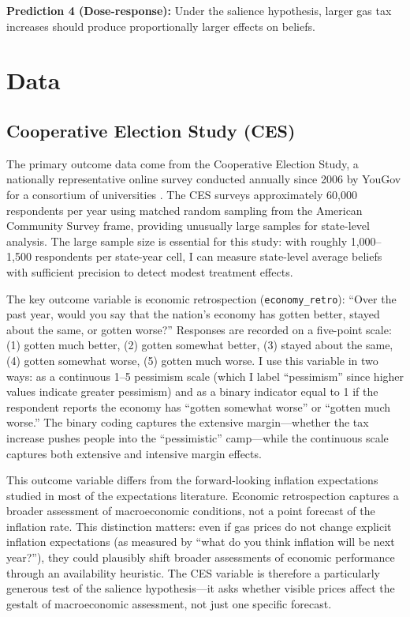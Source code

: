 \documentclass[12pt]{article}
\begin{document}
\textbf{Prediction 4 (Dose-response):} Under the salience hypothesis, larger gas tax increases should produce proportionally larger effects on beliefs.

\section{Data}

\subsection{Cooperative Election Study (CES)}

The primary outcome data come from the Cooperative Election Study, a nationally representative online survey conducted annually since 2006 by YouGov for a consortium of universities \citep{schaffner2023cooperative}. The CES surveys approximately 60,000 respondents per year using matched random sampling from the American Community Survey frame, providing unusually large samples for state-level analysis. The large sample size is essential for this study: with roughly 1,000--1,500 respondents per state-year cell, I can measure state-level average beliefs with sufficient precision to detect modest treatment effects.

The key outcome variable is economic retrospection (\texttt{economy\_retro}): ``Over the past year, would you say that the nation's economy has gotten better, stayed about the same, or gotten worse?'' Responses are recorded on a five-point scale: (1) gotten much better, (2) gotten somewhat better, (3) stayed about the same, (4) gotten somewhat worse, (5) gotten much worse. I use this variable in two ways: as a continuous 1--5 pessimism scale (which I label ``pessimism'' since higher values indicate greater pessimism) and as a binary indicator equal to 1 if the respondent reports the economy has ``gotten somewhat worse'' or ``gotten much worse.'' The binary coding captures the extensive margin---whether the tax increase pushes people into the ``pessimistic'' camp---while the continuous scale captures both extensive and intensive margin effects.

This outcome variable differs from the forward-looking inflation expectations studied in most of the expectations literature. Economic retrospection captures a broader assessment of macroeconomic conditions, not a point forecast of the inflation rate. This distinction matters: even if gas prices do not change explicit inflation expectations (as measured by ``what do you think inflation will be next year?''), they could plausibly shift broader assessments of economic performance through an availability heuristic. The CES variable is therefore a particularly generous test of the salience hypothesis---it asks whether visible prices affect the gestalt of macroeconomic assessment, not just one specific forecast.
\end{document}
